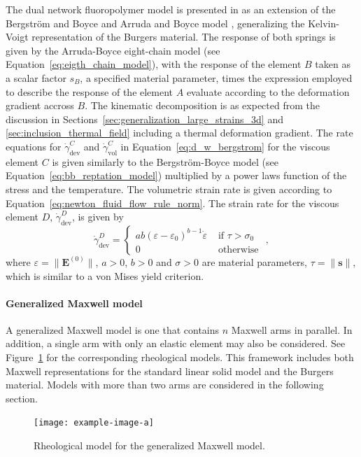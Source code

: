The dual network fluoropolymer model is presented in \cite{bergstromConstitutiveModelPredicting2005} as an extension of the Bergström and Boyce \citep{bergstromConstitutiveModelingLarge1998} and Arruda and Boyce model \citep{arrudaEffectsStrainRate1995}, generalizing the Kelvin-Voigt representation of the Burgers material.
The response of both springs is given by the Arruda-Boyce eight-chain model (see Equation~\eqref{eq:eigth_chain_model}), with the response of the element $B$ taken as a scalar factor $s_B$, a specified material parameter, times the expression employed to describe the response of the element $A$ evaluate according to the deformation gradient accross $B$.
The kinematic decomposition is as expected from the discussion in Sections~\ref{sec:generalization_large_strains_3d} and \ref{sec:inclusion_thermal_field} including a thermal deformation gradient.
The rate equations for $\dot\gamma^C_\text{dev}$ and $\dot\gamma^C_\text{vol}$ in Equation~\eqref{eq:d_w_bergstrom} for the viscous element $C$ is given similarly to the Bergström-Boyce model (see Equation~\eqref{eq:bb_reptation_model}) multiplied by a power laws function of the stress and the temperature.
The volumetric strain rate is given according to Equation~\eqref{eq:newton_fluid_flow_rule_norm}.
The strain rate for the viscous element $D$, $\dot \gamma^D_\text{dev}$, is given by
\begin{equation}
	\dot{\gamma}_\text{dev}^D=\begin{cases}
	a b\left(\varepsilon-\varepsilon_0\right)^{b-1} \dot{\varepsilon} & \text { if } \tau>\sigma_0 \\
	0 & \text { otherwise }
	\end{cases},
\end{equation}
where $\varepsilon = \|\mathbf E^{(0)}\|$, $a >0$, $b>0$ and $\sigma>0$ are material parameters, $\tau = \|\mathbf s\|$, which is similar to a von Mises yield criterion.

\paragraph{Generalized Maxwell model}
A generalized Maxwell model is one that contains $n$ Maxwell arms in parallel.
In addition, a single arm with only an elastic element may also be considered.
See Figure~\ref{fig:rheo_model_gen_maxwell} for the corresponding rheological models.
This framework includes both Maxwell representations for the standard linear solid model and the Burgers material.
Models with more than two arms are considered in the following section.
\begin{figure}[htbp]
	\centering
	\texttt{[image: example-image-a]}
	\caption{Rheological model for the generalized Maxwell model.}
\label{fig:rheo_model_gen_maxwell}
\end{figure}

